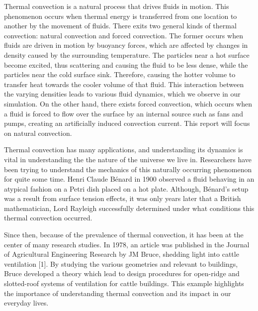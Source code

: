 Thermal convection is a natural process that drives fluids in motion. This phenomenon occurs when thermal energy is transferred from one location to another by the movement of fluids. There exits two general kinds of thermal convection: natural convection and forced convection. The former occurs when fluids are driven in motion by buoyancy forces, which are affected by changes in density caused by the surrounding temperature. The particles near a hot surface become excited, thus scattering and causing the fluid to be less dense, while the particles near the cold surface sink. Therefore, causing the hotter volume to transfer heat towards the cooler volume of that fluid. This interaction between the varying densities leads to various fluid dynamics, which we observe in our simulation. On the other hand, there exists forced convection, which occurs when a fluid is forced to flow over the surface by an internal source such as fans and pumps, creating an artificially induced convection current. This report will focus on natural convection. 

Thermal convection has many applications, and understanding its dynamics is vital in understanding the the nature of the universe we live in. Researchers have been trying to understand the mechanics of this naturally occurring phenomenon for quite some time. Henri Claude Bénard in 1900 observed a fluid behaving in an atypical fashion on a Petri dish placed on a hot plate. Although, Bénard's setup was a result from surface tension effects, it was only years later that a British mathematician, Lord Rayleigh successfully determined under what conditions this thermal convection occurred. 

Since then, because of the prevalence of thermal convection, it has been at the center of many research studies. In 1978, an article was published in the Journal of Agricultural Engineering Research by JM Bruce, shedding light into cattle ventilation [1]. By studying the various geometries and relevant to buildings, Bruce developed a theory which lead to design procedures for open-ridge and slotted-roof systems of ventilation for cattle buildings. This example highlights the importance of understanding thermal convection and its impact in our everyday lives. 

